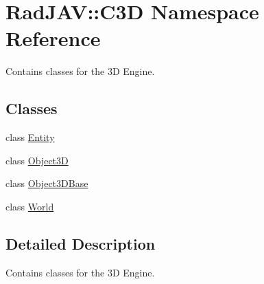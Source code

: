 \hypertarget{namespace_rad_j_a_v_1_1_c3_d}{}\section{Rad\+J\+AV\+:\+:C3D Namespace Reference}
\label{namespace_rad_j_a_v_1_1_c3_d}


Contains classes for the 3D Engine.  


\subsection*{Classes}
\begin{DoxyCompactItemize}
\item 
class \mbox{\hyperlink{class_rad_j_a_v_1_1_c3_d_1_1_entity}{Entity}}
\item 
class \mbox{\hyperlink{class_rad_j_a_v_1_1_c3_d_1_1_object3_d}{Object3D}}
\item 
class \mbox{\hyperlink{class_rad_j_a_v_1_1_c3_d_1_1_object3_d_base}{Object3\+D\+Base}}
\item 
class \mbox{\hyperlink{class_rad_j_a_v_1_1_c3_d_1_1_world}{World}}
\end{DoxyCompactItemize}


\subsection{Detailed Description}
Contains classes for the 3D Engine. 